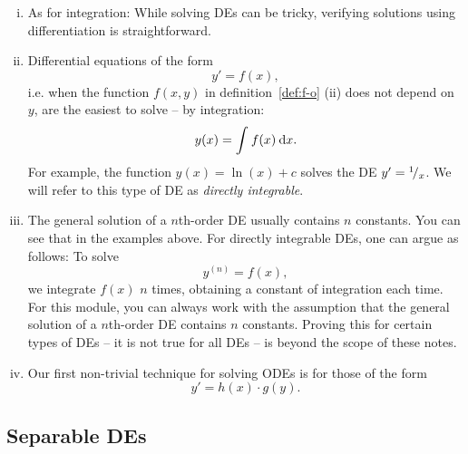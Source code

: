 \begin{remark}
\label{rem:first_de_rems}	
\begin{enumerate}[(i)]
	\item As for integration: While solving DEs can be tricky, verifying solutions using differentiation is straightforward.
	\item Differential equations of the form
	\[ y'=f(x), \]
	i.e. when the function $f(x,y)$ in definition~\ref{def:f-o} (ii) does not depend on $y$, are the easiest to solve -- by integration:
	\[ y(x) = \int_{}^{} f(x) \: \mathrm{d} x. \]
	For example, the function $y(x)=\ln(x)+c$ solves the DE $y'={}^{1}\!/_{x}$. We will refer to this type of DE as \emph{directly integrable}.
	\item The general solution of a $n$th-order DE usually contains $n$ constants. You can see that in the examples above. For directly integrable DEs, one can argue as follows: To solve
	\[ y^{(n)}=f(x), \]
	we integrate $f(x)$ $n$ times, obtaining a constant of integration each time. For this module, you can always work with the assumption that the general solution of a $n$th-order DE contains $n$ constants. Proving this for certain types of DEs -- it is not true for all DEs -- is beyond the scope of these notes.
	\item Our first non-trivial technique for solving ODEs is for those of the form
	\[ y'=h(x) \cdot g(y). \]
\end{enumerate}
\end{remark}

\subsection{Separable DEs}

